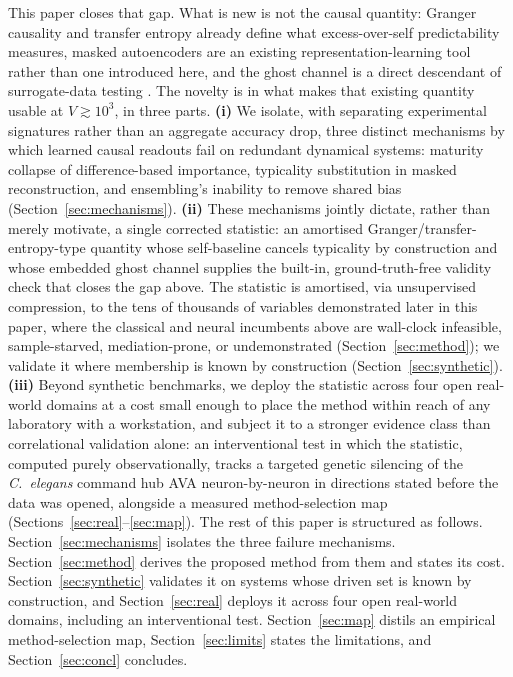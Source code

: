 \documentclass[11pt]{article}
\begin{document}
This paper closes that gap. What is new is not the causal quantity:
Granger causality and transfer entropy \citep{granger1969,schreiber2000,barnett2009}
already define what excess-over-self predictability measures, masked
autoencoders \citep{he2022mae,devlin2019} are an existing
representation-learning tool rather than one introduced here, and the
ghost channel is a direct descendant of surrogate-data testing
\citep{theiler1992}. The novelty is in what makes that existing quantity
usable at $V \gtrsim 10^3$, in three parts. \textbf{(i)} We isolate, with
separating experimental signatures rather than an aggregate accuracy
drop, three distinct mechanisms by which learned causal readouts fail on
redundant dynamical systems: maturity collapse of difference-based
importance, typicality substitution in masked reconstruction, and
ensembling's inability to remove shared bias (Section~\ref{sec:mechanisms}).
\textbf{(ii)} These mechanisms jointly dictate, rather than merely
motivate, a single corrected statistic: an amortised
Granger/transfer-entropy-type quantity whose self-baseline cancels
typicality by construction and whose embedded ghost channel supplies the
built-in, ground-truth-free validity check that closes the gap above.
The statistic is amortised, via unsupervised compression, to the tens of
thousands of variables demonstrated later in this paper, where the classical and
neural incumbents above are wall-clock infeasible, sample-starved,
mediation-prone, or undemonstrated (Section~\ref{sec:method}); we
validate it where membership is known by construction
(Section~\ref{sec:synthetic}). \textbf{(iii)} Beyond synthetic
benchmarks, we deploy the statistic across four open real-world domains
at a cost small enough to place the method within reach of any
laboratory with a workstation, and subject it to a stronger evidence
class than correlational validation alone: an interventional test in which the statistic,
computed purely observationally, tracks a targeted genetic silencing of
the \emph{C.~elegans} command hub AVA neuron-by-neuron in directions
stated before the data was opened, alongside a measured
method-selection map (Sections~\ref{sec:real}--\ref{sec:map}).
The rest of this paper is structured as follows.
Section~\ref{sec:mechanisms} isolates the three failure mechanisms.
Section~\ref{sec:method} derives the proposed method from them and states
its cost. Section~\ref{sec:synthetic} validates it on systems whose driven
set is known by construction, and Section~\ref{sec:real} deploys it across
four open real-world domains, including an interventional test.
Section~\ref{sec:map} distils an empirical method-selection map,
Section~\ref{sec:limits} states the limitations, and
Section~\ref{sec:concl} concludes.
\end{document}
